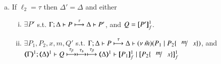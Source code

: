 \begin{proposition}
\begin{enumerate}[1.]
\begin{enumerate}[a)]
				\item 
					If $\ell_2 = \tau$ 
					then $\Delta' = \Delta$ and 
					either
%
					\begin{enumerate}[(i)]
						\item	$\exists P'$ s.t. 
							$\Gamma; \Delta \vdash P \stackrel{\tau}{\longmapsto} \Delta \vdash P'$,
							and $Q = [\!\![P']\!\!]^{1}_f$.	

						\item
							$\exists P_1, P_2, x, m, Q'$ s.t. 
							$\horel{\Gamma}{\Delta}{P}{\hby{\tau}}{\Delta}{\newsp{\tilde{m}}{P_1 \Par P_2\subst{m}{x}} }$, and\\
							$\horel{\tmap{\Gamma}{1}}{\tmap{\Delta}{1}}{Q}{\hby{\btau} \hby{\stau} \hby{\btau}}{\tmap{\Delta}{1}}{\pmapp{P_1}{1}{f} \Par \pmapp{P_2\subst{m}{x}}{1}{f}}$ 

			\end{enumerate}
		    \end{enumerate}
		    
	\end{enumerate}
\end{proposition}


